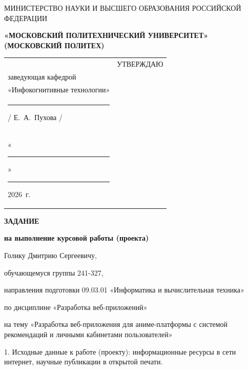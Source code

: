 \documentclass[14pt, a4paper]{extarticle}
\begin{document}
\pagestyle{empty}


\begin{center}
    {\small МИНИСТЕРСТВО НАУКИ И ВЫСШЕГО ОБРАЗОВАНИЯ РОССИЙСКОЙ ФЕДЕРАЦИИ}


    {\small \textbf{«МОСКОВСКИЙ ПОЛИТЕХНИЧЕСКИЙ УНИВЕРСИТЕТ»}} \\
    {\small \textbf{(МОСКОВСКИЙ ПОЛИТЕХ)}}
\end{center}

\begin{tabularx}{\textwidth}{@{} p{} p{} @{}}
     &
    \raggedright
    УТВЕРЖДАЮ                          \\
    заведующая кафедрой                \\
    «Инфокогнитивные технологии»       \\[0.3cm]

    \rule{3cm}{0.4pt} / Е.~А.~Пухова / \\[0.1cm]

    «\rule{0.8cm}{0.4pt}» \rule{3cm}{0.4pt} 2026~г.
\end{tabularx}


\begin{center}

    { \large \textbf{ЗАДАНИЕ}}

    \textbf{на выполнение курсовой работы (проекта)}

    Голику Дмитрию Сергеевичу,

\end{center}

обучающемуся группы 241-327,

направления подготовки 09.03.01 «Информатика и вычислительная техника»

по дисциплине «Разработка веб-приложений»

на тему «Разработка веб-приложения для аниме-платформы с системой рекомендаций и личными кабинетами пользователей»

1. Исходные данные к работе (проекту): информационные ресурсы в сети
интернет, научные публикации в открытой печати.
\end{document}
